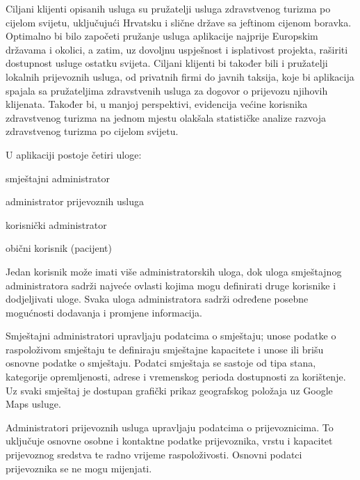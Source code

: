 		
		
		
		\break
		Ciljani klijenti opisanih usluga su pružatelji usluga zdravstvenog turizma po cijelom svijetu, uključujući Hrvatsku i slične države sa jeftinom cijenom boravka. Optimalno bi bilo započeti pružanje usluga aplikacije najprije Europskim državama i okolici, a zatim, uz dovoljnu uspješnost i isplativost projekta, raširiti dostupnost usluge ostatku svijeta. Ciljani klijenti bi također bili i pružatelji lokalnih prijevoznih usluga, od privatnih firmi do javnih taksija, koje bi aplikacija spajala sa pružateljima zdravstvenih usluga za dogovor o prijevozu njihovih klijenata. Također bi, u manjoj perspektivi, evidencija većine korisnika zdravstvenog turizma na jednom mjestu olakšala statističke analize razvoja zdravstvenog turizma po cijelom svijetu.
		
		\medskip
		U aplikaciji postoje četiri uloge:
		\begin{packed_item}
			\item  smještajni administrator
			\item  administrator prijevoznih usluga
			\item  korisnički administrator
			\item  obični korisnik (pacijent)
		\end{packed_item}
		
		Jedan korisnik može imati više administratorskih uloga, dok uloga smještajnog administratora sadrži najveće ovlasti kojima mogu definirati druge korisnike i dodjeljivati uloge. Svaka uloga administratora sadrži određene posebne mogućnosti dodavanja i promjene informacija.
		
		\smallskip
		Smještajni administratori upravljaju podatcima o smještaju; unose podatke o raspoloživom smještaju te definiraju smještajne kapacitete i unose ili brišu osnovne podatke o smještaju. Podatci smještaja se sastoje od tipa stana, kategorije opremljenosti, adrese i vremenskog perioda dostupnosti za korištenje. Uz svaki smještaj je dostupan grafički prikaz geografskog položaja uz Google Maps usluge.
		
		Administratori prijevoznih usluga upravljaju podatcima o prijevoznicima. To uključuje osnovne osobne i kontaktne podatke prijevoznika, vrstu i kapacitet prijevoznog sredstva te radno vrijeme raspoloživosti. Osnovni podatci prijevoznika se ne mogu mijenjati.
		
